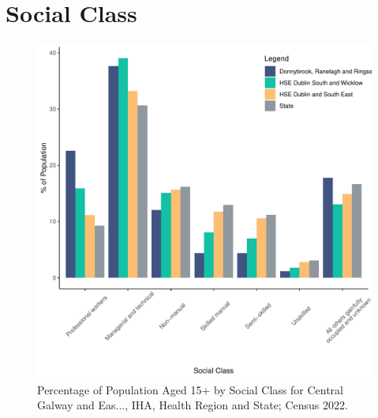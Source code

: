 \documentclass{article}
\begin{document}
\section{Social Class}\label{sect:SC}
\begin{figure}[H]
	\centering
	\includegraphics[width = 140mm]{../figures/SocialClassED.pdf}
	\caption{Percentage of Population Aged 15+ by Social Class for Central Galway and Eas..., IHA, Health Region and State; Census 2022.}
	\label{fig:vbnv}
	\end{figure}
\end{document}

